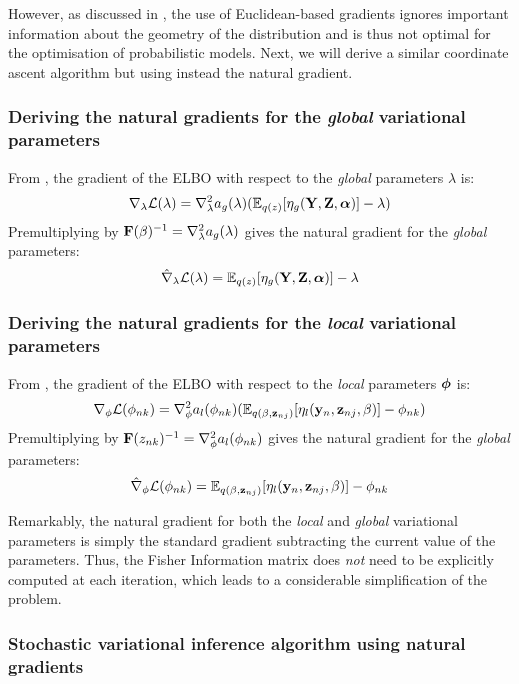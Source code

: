 However, as discussed in , the use of Euclidean-based gradients ignores important information about the geometry of the distribution and is thus not optimal for the optimisation of probabilistic models. Next, we will derive a similar coordinate ascent algorithm but using instead the natural gradient.


\subsubsection{Deriving the natural gradients for the \textit{global} variational parameters}

From , the gradient of the ELBO with respect to the \textit{global} parameters $\lambda$ is:
\[
	\nabla_{\lambda} \mathcal{L}(\lambda) = \nabla_{\lambda}^{2} a_g(\lambda)(\mathbb{E}_{q(z)}[\eta_g({\bf Y},{\bf Z},\mbox{\boldmath $\alpha$})] - \lambda)
\]
Premultiplying by ${\bf F}(\beta)^{-1}=\nabla_{\lambda}^{2} a_g(\lambda)$ gives the natural gradient for the \textit{global} parameters:
\[
	\hat{\nabla}_{\lambda} \mathcal{L}(\lambda) = \mathbb{E}_{q(z)}[\eta_g({\bf Y},{\bf Z},\mbox{\boldmath $\alpha$})] - \lambda
\]


\subsubsection{Deriving the natural gradients for the \textit{local} variational parameters}

From , the gradient of the ELBO with respect to the \textit{local} parameters $\mbox{\boldmath $\phi$}$ is:
\[
	\nabla_{\phi} \mathcal{L}(\phi_{nk}) = \nabla_{\phi}^2 a_l(\phi_{nk}) (\mathbb{E}_{q(\beta,{\bf z}_{nj})}[\eta_l({\bf y}_n,{\bf z}_{nj},\beta)] - \phi_{nk})
\]
Premultiplying by ${\bf F}(z_{nk})^{-1}=\nabla_{\phi}^{2} a_l(\phi_{nk})$ gives the natural gradient for the \textit{global} parameters:
\[
	\hat{\nabla}_{\phi} \mathcal{L}(\phi_{nk}) = \mathbb{E}_{q(\beta,{\bf z}_{nj})}[\eta_l({\bf y}_n,{\bf z}_{nj},\beta)] - \phi_{nk}
\]

Remarkably, the natural gradient for both the \textit{local} and \textit{global} variational parameters is simply the standard gradient subtracting the current value of the parameters. Thus, the Fisher Information matrix does \textit{not} need to be explicitly computed at each iteration, which leads to a considerable simplification of the problem. 


\subsubsection{Stochastic variational inference algorithm using natural gradients}

